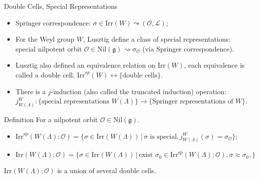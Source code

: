 \documentclass[fleqn,xcolor=dvipsnames]{beamer}
\newcommand{\CL}{{\mathcal {L}}}
\newcommand{\CO}{{\mathcal {O}}}
\newcommand{\fg}{\mathfrak{g}}
\newcommand{\Irr}{{\mathrm{Irr}}}
\newcommand{\Nil}{{\mathrm{Nil}}}
\newcommand{\set}[2]{\{#1\,|\,#2\}}
\begin{document}
\begin{frame}{Double Cells, Special Representations}
  
\begin{itemize}
  \item Springer correspondence: $\sigma \in \Irr(W) \leadsto (\CO,\CL)$;
  \item For the Weyl group $W$, Lusztig define a class of special representations: special nilpotent orbit $\CO \in \Nil(\fg)\rightsquigarrow \sigma_{\CO}$ (via Springer correspondence).
  \item Lusztig also defined an equivalence relation on $\Irr(W)$, each equivalence is called a double cell, $\Irr^{sp}(W) \leftrightarrow \{ \textrm{double cells} \}$.
  \item There is a $j$-induction (also called the truncated induction) operation: $j_{W(\Lambda)}^{W}: \{ \textrm{special representations $W(\Lambda)$}\} \to \{\textrm{Springer representations of $W$} \}$.
\end{itemize}
  
\end{frame}





\begin{frame}
  \begin{block}{Definition}
    For a nilpotent orbit $\CO \in \Nil(\fg)$.
    \begin{itemize}
      \item $\Irr^{\mathrm{sp}}(W(\Lambda);\CO) = \set{\sigma \in \Irr(W(\Lambda))}{\textrm{$\sigma$ is special}, j_{W(\Lambda)}^{W}(\sigma) = \sigma_{\CO}}$;
      \item $\Irr(W(\Lambda);\CO) = \set{\sigma \in \Irr(W(\Lambda))}{\textrm{exist $\sigma_{0} \in \Irr^{\mathrm{sp}}(W(\Lambda);\CO)$}, \sigma \approx \sigma_{0}, }$
    \end{itemize}
  \end{block}
  $\Irr(W(\Lambda);\CO)$ is a union of several double cells.
\end{frame}
\end{document}
